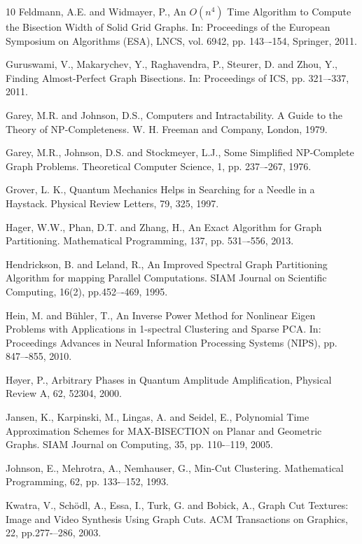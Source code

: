 \documentclass[a4paper]{article}
\begin{document}
\begin{thebibliography}{10}
Feldmann, A.E. and Widmayer, P.,
An $O(n^4)$ Time Algorithm to Compute the Bisection Width of Solid Grid Graphs. 
In: Proceedings of the European Symposium on Algorithms (ESA), LNCS, vol. 6942, pp. 143–-154, Springer, 2011.





Guruswami, V., Makarychev, Y., Raghavendra, P., Steurer, D. and Zhou, Y.,
Finding Almost-Perfect Graph Bisections. 
In: Proceedings of ICS, pp. 321–-337, 2011.


Garey, M.R. and Johnson, D.S., 
Computers and Intractability. A Guide to the Theory of NP-Completeness. W. H. Freeman and Company, London, 1979.

Garey, M.R., Johnson, D.S. and Stockmeyer, L.J., 
Some Simplified NP-Complete Graph Problems. 
Theoretical Computer Science, 1, pp. 237–-267, 1976.

Grover, L. K.,
Quantum Mechanics Helps in Searching for a Needle in a Haystack.
Physical Review Letters, 79, 325, 1997.


Hager, W.W., Phan, D.T. and Zhang, H.,
An Exact Algorithm for Graph Partitioning. 
Mathematical Programming, 137, pp. 531–-556, 2013.

Hendrickson, B. and Leland, R.,
An Improved Spectral Graph Partitioning Algorithm for mapping Parallel Computations. 
SIAM Journal on Scientific Computing, 16(2), pp.452–-469, 1995.


Hein, M. and Bühler, T., 
An Inverse Power Method for Nonlinear Eigen Problems with Applications in 1-spectral Clustering and Sparse PCA. 
In: Proceedings Advances in Neural Information Processing Systems (NIPS), pp. 847–-855, 2010.

H{\o}yer, P., 
Arbitrary Phases in Quantum Amplitude Amplification,
Physical Review A, 62, 52304, 2000.


Jansen, K., Karpinski, M., Lingas, A. and Seidel, E.,
Polynomial Time Approximation Schemes for MAX-BISECTION on Planar and Geometric Graphs. 
SIAM Journal on Computing, 35, pp. 110-–119, 2005.

Johnson, E., Mehrotra, A., Nemhauser, G., 
Min-Cut Clustering. 
Mathematical Programming, 62, pp. 133-–152, 1993.

Kwatra, V., Schödl, A., Essa, I., Turk, G. and Bobick, A.,
Graph Cut Textures: Image and Video Synthesis Using Graph Cuts. 
ACM Transactions on Graphics, 22, pp.277-–286, 2003.


\end{thebibliography}
\end{document}
